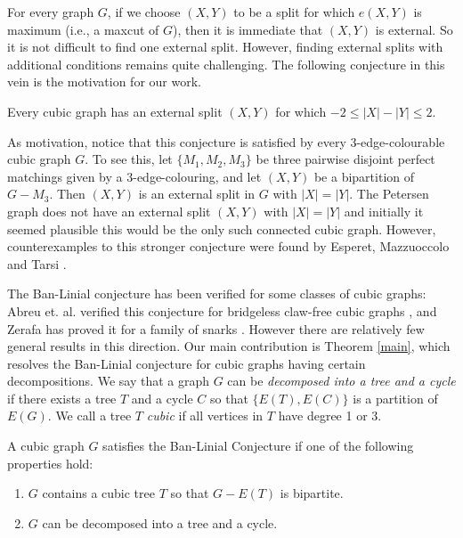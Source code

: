 \documentclass[12pt]{article}
\begin{document}
For every graph $G$, if we choose $(X,Y)$ to be a split for which $e(X,Y)$ is maximum (i.e., a maxcut of $G$), then it is immediate that $(X,Y)$ is external.  So it is not difficult to find one external split.  However, finding external splits with additional conditions remains quite challenging.  The following conjecture in this vein is the motivation for our work.

\begin{conjecture}
Every cubic graph has an external split $(X,Y)$ for which $-2 \le |X| - |Y| \le 2$.
\end{conjecture}

As motivation, notice that this conjecture is satisfied by every 3-edge-colourable cubic graph $G$.  To see this, let $\{M_1, M_2, M_3\}$ be three pairwise disjoint perfect matchings given by a 3-edge-colouring, and let $(X,Y)$ be a bipartition of $G - M_3$. Then $(X,Y)$ is an external split in $G$ with $|X| = |Y|$. The Petersen graph does not have an external split $(X,Y)$ with $|X| = |Y|$ and initially it seemed plausible this would be the only such connected cubic graph.  However, counterexamples to this stronger conjecture were found by Esperet, Mazzuoccolo and Tarsi \cite{EsperetL.2017FaBi, BanAmir2016IPoR}.  

The Ban-Linial conjecture has been verified for some classes of cubic graphs: Abreu et. al. verified this conjecture for bridgeless claw-free cubic graphs \cite{ABREU2018214}, and Zerafa has proved it for a family of snarks \cite{ZerafaJeanPaul2022BCat}.  However there are relatively few general results in this direction.  Our main contribution is Theorem \ref{main}, which resolves the Ban-Linial conjecture for cubic graphs having certain decompositions.  We say that a graph $G$ can be \emph{decomposed into a tree and a cycle} if there exists a tree $T$ and a cycle $C$ so that $\{E(T), E(C)\}$ is a partition of $E(G)$.  We call a tree $T$ \emph{cubic} if all vertices in $T$ have degree 1 or 3.  

\begin{theorem}
\label{main}
A cubic graph $G$ satisfies the Ban-Linial Conjecture if one of the following properties hold:
\begin{enumerate}
\item $G$ contains a cubic tree $T$ so that $G - E(T)$ is bipartite.
\item $G$ can be decomposed into a tree and a cycle.
\end{enumerate}
\end{theorem}
\end{document}
